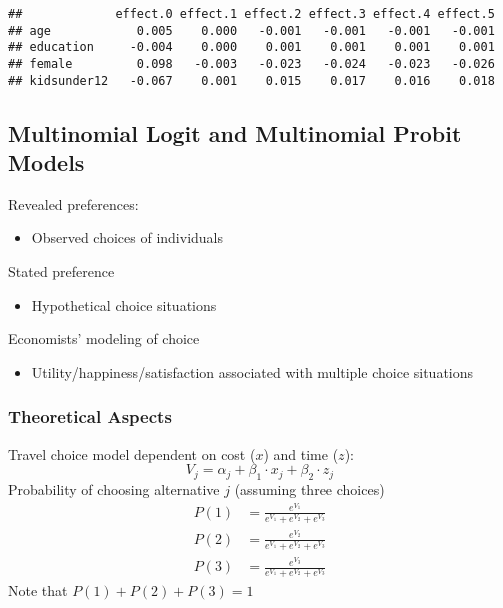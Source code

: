 \documentclass[
]{article}
\providecommand{\tightlist}{%
  \setlength{\itemsep}{0pt}\setlength{\parskip}{0pt}}
\begin{document}
\begin{verbatim}
##             effect.0 effect.1 effect.2 effect.3 effect.4 effect.5
## age            0.005    0.000   -0.001   -0.001   -0.001   -0.001
## education     -0.004    0.000    0.001    0.001    0.001    0.001
## female         0.098   -0.003   -0.023   -0.024   -0.023   -0.026
## kidsunder12   -0.067    0.001    0.015    0.017    0.016    0.018
\end{verbatim}

\hypertarget{multinomial-logit-and-multinomial-probit-models}{%
\subsection{Multinomial Logit and Multinomial Probit Models}\label{multinomial-logit-and-multinomial-probit-models}}

Revealed preferences:

\begin{itemize}
\tightlist
\item
  Observed choices of individuals
\end{itemize}

Stated preference

\begin{itemize}
\tightlist
\item
  Hypothetical choice situations
\end{itemize}

Economists' modeling of choice

\begin{itemize}
\tightlist
\item
  Utility/happiness/satisfaction associated with multiple choice situations
\end{itemize}

\hypertarget{theoretical-aspects-1}{%
\subsubsection{Theoretical Aspects}\label{theoretical-aspects-1}}

Travel choice model dependent on cost (\(x\)) and time (\(z\)):
\[V_j = \alpha_j + \beta_1 \cdot x_j + \beta_2 \cdot z_j\]
Probability of choosing alternative \(j\) (assuming three choices)
\[\begin{align*}
    P(1) &= \frac{e^{V_1}}{e^{V_1}+e^{V_2}+e^{V_3}}\\
    P(2) &= \frac{e^{V_2}}{e^{V_1}+e^{V_2}+e^{V_3}}\\
    P(3) &= \frac{e^{V_3}}{e^{V_1}+e^{V_2}+e^{V_3}}
\end{align*}\]
Note that \(P(1)+P(2)+P(3) = 1\)
\end{document}
